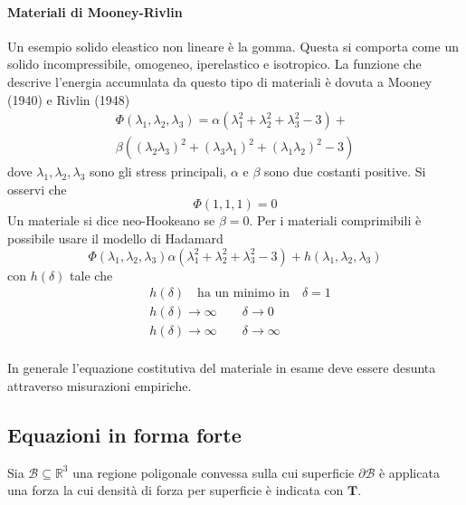\paragraph{Materiali di Mooney-Rivlin}
Un esempio solido eleastico non lineare è la gomma. Questa si comporta come un solido incompressibile, omogeneo, iperelastico e isotropico.
La funzione che descrive l'energia accumulata da questo tipo di materiali è dovuta a Mooney (1940) e Rivlin (1948)
\begin{multline*}
\Phi(\lambda_1,\lambda_2,\lambda_3) = \alpha(\lambda_1^2+\lambda_2^2+\lambda_3^2-3) + \\ \beta((\lambda_2\lambda_3)^2+(\lambda_3\lambda_1)^2+(\lambda_1\lambda_2)^2 -3)
\end{multline*}
dove $\lambda_1,\lambda_2,\lambda_3$ sono gli stress principali, $\alpha$ e $\beta$ sono due costanti positive. 
Si osservi che 
\begin{equation*}
\Phi(1,1,1) = 0
\end{equation*}
Un materiale si dice neo-Hookeano se $\beta=0$.
Per i materiali comprimibili è possibile usare il modello di Hadamard
\begin{equation*}
\Phi(\lambda_1,\lambda_2,\lambda_3)\alpha(\lambda_1^2+\lambda_2^2+\lambda_3^2-3) + h(\lambda_1,\lambda_2,\lambda_3)
\end{equation*}
con $h(\delta)$ tale che
\begin{align*}
&h(\delta) \quad\text{ha un minimo in}\quad\delta=1 \\
&h(\delta)\to\infty\qquad\delta\to 0\\
&h(\delta)\to\infty\qquad\delta\to\infty\\
\end{align*}

In generale l'equazione costitutiva del materiale in esame deve essere desunta attraverso misurazioni empiriche.


\subsection{Equazioni in forma forte}

Sia $\mathcal{B} \subseteq \mathbb{R}^3$ una regione poligonale convessa sulla cui superficie $\partial\mathcal{B}$ è applicata una forza la cui densità di forza per superficie è indicata con $\mathbf{T}$.

